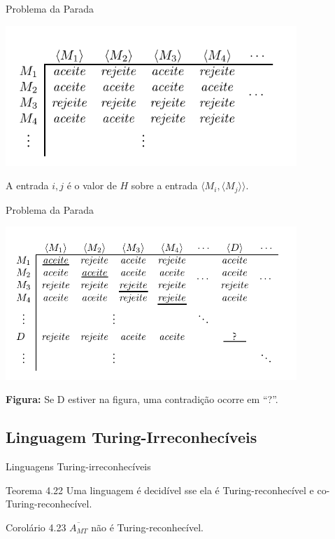 \documentclass[xcolor=dvipsnames,table]{beamer}
\begin{document}
	\begin{frame}{Problema da Parada}
		\begin{center}
			\includegraphics[width=11cm]{images/h.png}
			
			 A entrada $i,j$ é o valor de $H$ sobre a entrada $\langle M_i , \langle M_j \rangle \rangle$.
		\end{center}
	\end{frame}

	\begin{frame}{Problema da Parada}
		\begin{center}
			\includegraphics[width=11cm]{images/d.png}
			
			{\bf Figura:} Se D estiver na figura, uma contradição ocorre em ``?''.
		\end{center}
	\end{frame}

	\subsection{Linguagem Turing-Irreconhecíveis}
	\begin{frame}{Linguagens Turing-irreconhecíveis}
		\begin{block}{Teorema 4.22}
			Uma linguagem é decidível sse ela é Turing-reconhecível e co-Turing-reconhecível.
		\end{block}   
		\begin{block}{Corolário 4.23}
			$\overline{A_{MT}}$ não é Turing-reconhecível.
		\end{block}
	\end{frame}
\end{document}

